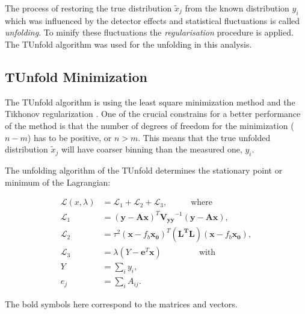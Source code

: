 The process of restoring the true distribution $\tilde{x}_{j}$ from the known distribution $y_{i}$ which was influenced
by the detector effects and statistical fluctuations is called \textit{unfolding}. To minify these fluctuations the 
\textit{regularisation} procedure is applied. The TUnfold \cite{Schmitt:2012kp} algorithm was used for the
unfolding in this analysis.

\subsection{TUnfold Minimization}\label{ssec:TUmini}

The TUnfold algorithm is using the least square minimization method and the Tikhonov regularization \cite{Tikhonov:1963}. One of the crucial 
constrains for a better performance of the method is that the number of degrees of freedom for the minimization ($n - m$) has to be positive,
or $n > m$. This means that the true unfolded distribution $\tilde{x}_j$ will have coarser binning than the measured one, $y_{i}$.

The unfolding algorithm of the TUnfold determines the stationary point or minimum of the Lagrangian:

\begin{align}
 \mathcal{L}(x, \lambda) & = \mathcal{L}_{1} + \mathcal{L}_{2} + \mathcal{L}_{3}, \;\;\;\;\;\;\;\;\;\; \textrm{where}\\
 \mathcal{L}_{1} & = (\mathbf{y} - \mathbf{A}\mathbf{x})^{T} \mathbf{V_{yy}}^{-1}(\mathbf{y} - \mathbf{A}\mathbf{x}),\\
 \mathcal{L}_{2} & = \tau^{2}(\mathbf{x} - f_{b}\mathbf{x_{0}})^{T} (\mathbf{L^{T}L}) (\mathbf{x} - f_{b}\mathbf{x_{0}}), \\
 \mathcal{L}_{3} & = \lambda(Y -\mathbf{e}^{T}\mathbf{x}) \;\;\;\;\;\;\;\;\;\;\;\;\;\;\;\; \textrm{with} \\
 Y & = \sum_{i} y_{i}, \\
 e_{j} & = \sum_{i} A_{ij}.
\end{align}

The bold symbols here correspond to the matrices and vectors.

